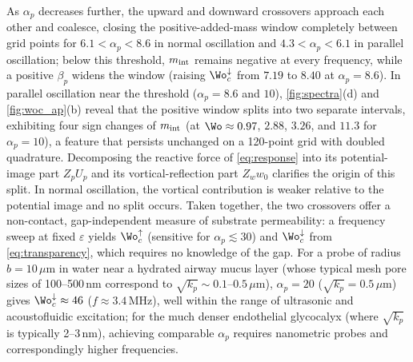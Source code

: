 As $\alpha_p$ decreases further, the upward and downward crossovers approach each other and coalesce, closing the
positive-added-mass window completely between grid points for $6.1<\alpha_p<8.6$ in normal oscillation and
$4.3<\alpha_p<6.1$ in parallel oscillation; below this threshold, $m_{\rm int}$ remains negative at every frequency,
while a positive $\beta_p$ widens the window (raising $\Wo_c^{\downarrow}$ from $7.19$ to $8.40$ at $\alpha_p=8.6$). In
parallel oscillation near the threshold ($\alpha_p=8.6$ and $10$), \cref{fig:spectra}(d) and \cref{fig:woc_ap}(b) reveal
that the positive window splits into two separate intervals, exhibiting four sign changes of $m_{\rm int}$ (at
$\Wo\approx0.97$, $2.88$, $3.26$, and $11.3$ for $\alpha_p=10$), a feature that persists unchanged on a 120-point grid
with doubled quadrature. Decomposing the reactive force of \cref{eq:response} into its potential-image part $Z_pU_p$ and
its vortical-reflection part $Z_ww_0$ clarifies the origin of this split.  In normal oscillation,
the vortical contribution is weaker relative to the potential image and no split occurs. Taken together, the two
crossovers offer a non-contact, gap-independent measure of substrate permeability: a frequency sweep at fixed
$\varepsilon$ yields $\Wo_c^{\uparrow}$ (sensitive for $\alpha_p\lesssim30$) and $\Wo_c^{\downarrow}$ from
\cref{eq:transparency}, which requires no knowledge of the gap. For a probe of radius $b=10\,\mu$m in water near a
hydrated airway mucus layer (whose typical mesh pore sizes of 100--500\,nm correspond to $\sqrt{k_p}\sim0.1$--$0.5\,\mu$m),
$\alpha_p=20$ ($\sqrt{k_p}=0.5\,\mu$m) gives $\Wo_c^{\downarrow}\approx46$ ($f\approx3.4$\,MHz), well within the range of
ultrasonic and acoustofluidic excitation; for the much denser endothelial glycocalyx (where $\sqrt{k_p}$ is typically
2--3\,nm), achieving comparable $\alpha_p$ requires nanometric probes and correspondingly higher frequencies.
